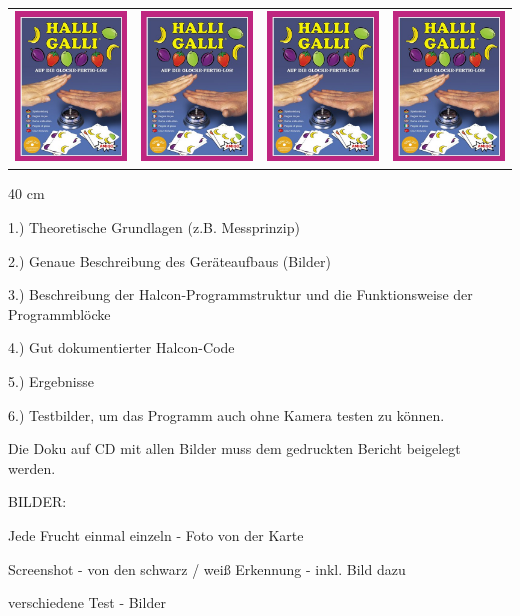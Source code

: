 \begin{center}
\begin{tabular}{cccc}
  \includegraphics[width=3cm]{Abbildungen/Cover} & \includegraphics[width=3cm]{Abbildungen/Cover} & \includegraphics[width=3cm]{Abbildungen/Cover} & \includegraphics[width=3cm]{Abbildungen/Cover} \\ 
\end{tabular}

\end{center}


40 cm 


1.) Theoretische Grundlagen (z.B. Messprinzip)

2.) Genaue Beschreibung des Geräteaufbaus (Bilder)

3.) Beschreibung der Halcon-Programmstruktur und die Funktionsweise der Programmblöcke

4.) Gut dokumentierter Halcon-Code 

5.) Ergebnisse 

6.) Testbilder, um das Programm auch ohne Kamera testen zu können.

Die Doku auf CD mit allen Bilder muss dem gedruckten Bericht beigelegt werden.

BILDER:

Jede Frucht einmal einzeln - Foto von der Karte

Screenshot - von den schwarz / weiß Erkennung - inkl. Bild dazu 

verschiedene Test - Bilder
